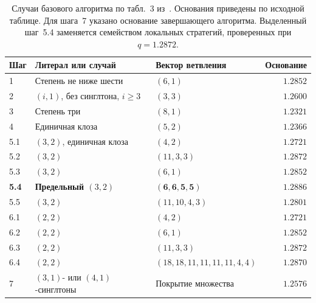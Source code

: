 \documentclass[10pt,twoside]{article}
\theoremstyle{definition}
\theoremstyle{remark}
\begin{document}
\begin{table}[!htbp]
\centering\small
\begin{tabularx}{\linewidth}{@{}lXlr@{}}
\toprule
Шаг & Литерал или случай & Вектор ветвления & Основание \\
\midrule
1 & Степень не ниже шести & $(6,1)$ & $1.2852$ \\
2 & $(i,1)$, без синглтона, $i\ge3$ & $(3,3)$ & $1.2600$ \\
3 & Степень три & $(8,1)$ & $1.2321$ \\
4 & Единичная клоза & $(5,2)$ & $1.2366$ \\
5.1 & $(3,2)$, единичная клоза & $(4,2)$ & $1.2721$ \\
5.2 & $(3,2)$ & $(11,3,3)$ & $1.2872$ \\
5.3 & $(3,2)$ & $(6,1)$ & $1.2852$ \\
\textbf{5.4} & \textbf{Предельный $(3,2)$} & $\mathbf{(6,6,5,5)}$ & $\mathbf{1.2886}$ \\
5.5 & $(3,2)$ & $(11,10,4,3)$ & $1.2801$ \\
6.1 & $(2,2)$ & $(4,2)$ & $1.2721$ \\
6.2 & $(2,2)$ & $(6,1)$ & $1.2852$ \\
6.3 & $(2,2)$ & $(11,3,3)$ & $1.2872$ \\
6.4 & $(2,2)$ & $(18,18,11,11,11,11,4,4)$ & $1.2870$ \\
7 & $(3,1)$- или $(4,1)$-синглтоны & Покрытие множества & $1.2576$ \\
\bottomrule
\end{tabularx}
\caption{Случаи базового алгоритма по табл.~3 из~\cite{Xiao2022}.
Основания приведены по исходной таблице. Для шага~7 указано
основание завершающего алгоритма. Выделенный шаг~5.4 заменяется
семейством локальных стратегий, проверенных при $q=1.2872$.}
\label{tab:global-vectors}
\end{table}
\end{document}

